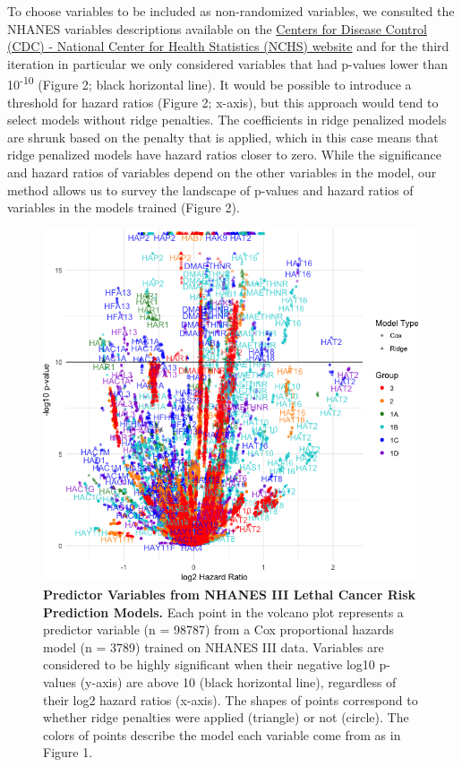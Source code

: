 \documentclass[12pt,twoside]{reedthesis}
\theoremstyle{definition}
\theoremstyle{definition}
\theoremstyle{definition}
\theoremstyle{remark}
\begin{document}
To choose variables to be included as non-randomized variables, we
consulted the NHANES variables descriptions available on the
\href{https://wwwn.cdc.gov/nchs/nhanes/nhanes3/DataFiles.aspx}{Centers
for Disease Control (CDC) - National Center for Health Statistics (NCHS)
website} and for the third iteration in particular we only considered
variables that had p-values lower than 10\textsuperscript{-10} (Figure
2; black horizontal line). It would be possible to introduce a threshold
for hazard ratios (Figure 2; x-axis), but this approach would tend to
select models without ridge penalties. The coefficients in ridge
penalized models are shrunk based on the penalty that is applied, which
in this case means that ridge penalized models have hazard ratios closer
to zero. While the significance and hazard ratios of variables depend on
the other variables in the model, our method allows us to survey the
landscape of p-values and hazard ratios of variables in the models
trained (Figure 2).
\begin{figure}
\centering
\includegraphics[width=1\textwidth,height=\textheight]{img/2-volcano-final100dpi.png}
\caption{\textbf{Predictor Variables from NHANES III Lethal Cancer Risk
Prediction Models.} Each point in the volcano plot represents a
predictor variable (n = 98787) from a Cox proportional hazards model (n
= 3789) trained on NHANES III data. Variables are considered to be
highly significant when their negative log10 p-values (y-axis) are above
10 (black horizontal line), regardless of their log2 hazard ratios
(x-axis). The shapes of points correspond to whether ridge penalties
were applied (triangle) or not (circle). The colors of points describe
the model each variable come from as in Figure 1.}
\end{figure}
\end{document}
